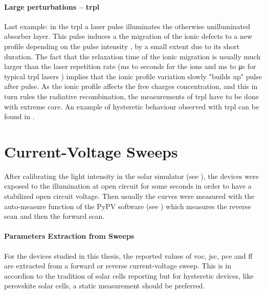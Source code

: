 		\paragraph{Large perturbations -- \gls{trpl}} Last example: in the \glsdesc{trpl} a laser pulse illuminates the otherwise unilluminated absorber layer. This pulse induces a the migration of the ionic defects to a new profile depending on the pulse intensity \cite{Levine2018}, by a small extent due to its short duration. The fact that the relaxation time of the ionic migration is usually much larger than the laser repetition rate (\si{\ms} to seconds for the ions \cite{Jacobs2018} and \si{\ms} to \si{\us} for typical \gls{trpl} lasers \cite{EdinburghInstruments}) implies that the ionic profile variation slowly "builds up" pulse after pulse. As the ionic profile affects the free charges concentration, and this in turn rules the radiative recombination, the measurements of \gls{trpl} have to be done with extreme care. An example of hysteretic behaviour observed with \gls{trpl} can be found in .


\section{Current-Voltage Sweeps}

	After calibrating the light intensity in the solar simulator (see ), the devices were exposed to the illumination at open circuit for some seconds in order to have a stabilized open circuit voltage. Then usually the curves were measured with the auto-measure function of the PyPV software (see ) which measures the reverse scan and then the forward scan.

	\paragraph{Parameters Extraction from Sweeps}
	For the devices studied in this thesis, the reported values of \gls{voc}, \gls{jsc}, \gls{pce} and \gls{ff} are extracted from a forward or reverse current-voltage sweep. This is in accordion to the tradition of solar cells reporting but for hysteretic devices, like perovskite solar cells, a static measurement should be preferred. %

